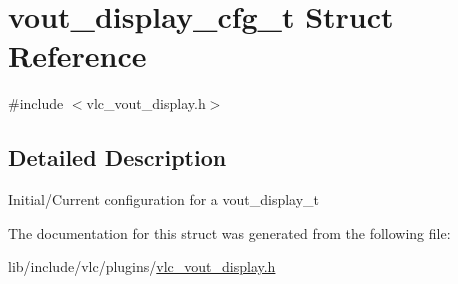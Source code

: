 \hypertarget{structvout__display__cfg__t}{}\section{vout\+\_\+display\+\_\+cfg\+\_\+t Struct Reference}
\label{structvout__display__cfg__t}


{\ttfamily \#include $<$vlc\+\_\+vout\+\_\+display.\+h$>$}



\subsection{Detailed Description}
Initial/\+Current configuration for a vout\+\_\+display\+\_\+t 

The documentation for this struct was generated from the following file\+:\begin{DoxyCompactItemize}
\item 
lib/include/vlc/plugins/\hyperlink{vlc__vout__display_8h}{vlc\+\_\+vout\+\_\+display.\+h}\end{DoxyCompactItemize}
